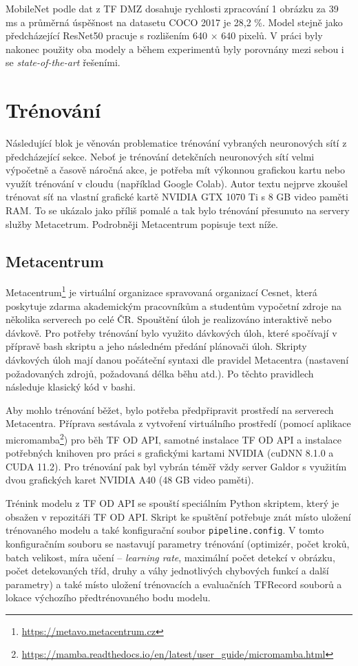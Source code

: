 MobileNet podle dat z TF DMZ dosahuje rychlosti zpracování 1 obrázku za 39 ms a průměrná úspěšnost na datasetu COCO 2017 je 28,2 \%. Model stejně jako předcházející ResNet50 pracuje s rozlišením 640 $\times$ 640 pixelů. V práci byly nakonec použity oba modely a během experimentů byly porovnány mezi sebou i se \emph{state-of-the-art} řešeními.

\section{Trénování}
\label{sekce:trenovani}
Následující blok je věnován problematice trénování vybraných neuronových sítí z předcházející sekce. Neboť je trénování detekčních neuronových sítí velmi výpočetně a časově náročná akce, je potřeba mít výkonnou grafickou kartu nebo využít trénování v cloudu (například Google Colab). Autor textu nejprve zkoušel trénovat síť na vlastní grafické kartě NVIDIA GTX 1070 Ti s 8 GB video paměti RAM. To se ukázalo jako příliš pomalé a tak bylo trénování přesunuto na servery služby Metacetrum. Podrobněji Metacentrum popisuje text níže.

\subsection*{Metacentrum}
Metacentrum\footnote{\url{https://metavo.metacentrum.cz}} je virtuální organizace spravovaná organizací Cesnet, která poskytuje zdarma akademickým pracovníkům a studentům vypočetní zdroje na několika serverech po celé ČR. Spouštění úloh je realizováno interaktivě nebo dávkově. Pro potřeby trénování bylo využito dávkových úloh, které spočívají v přípravě bash skriptu a jeho následném předání plánovači úloh. Skripty dávkových úloh mají danou počáteční syntaxi dle pravidel Metacentra (nastavení požadovaných zdrojů, požadovaná délka běhu atd.). Po těchto pravidlech následuje klasický kód v bashi.

Aby mohlo trénování běžet, bylo potřeba předpřipravit prostředí na serverech Metacentra. Příprava sestávala z vytvoření virtuálního prostředí (pomocí aplikace micromamba\footnote{\url{https://mamba.readthedocs.io/en/latest/user\_guide/micromamba.html}}) pro běh TF OD API, samotné instalace TF OD API a instalace potřebných knihoven pro práci s grafickými kartami NVIDIA (cuDNN 8.1.0 a CUDA 11.2). Pro trénování pak byl vybrán téměř vždy server Galdor s využitím dvou grafických karet NVIDIA A40 (48 GB video paměti).

Trénink modelu z TF OD API se spouští speciálním Python skriptem, který je obsažen v repozitáři TF OD API. Skript ke spuštění potřebuje znát místo uložení trénovaného modelu a také konfigurační soubor \texttt{pipeline.config}. V tomto konfiguračním souboru se nastavují parametry trénování (optimizér, počet kroků, batch velikost, míra učení -- \emph{learning rate}, maximální počet detekcí v obrázku, počet detekovaných tříd, druhy a váhy jednotlivých chybových funkcí a další parametry) a také místo uložení trénovacích a evaluačních TFRecord souborů a lokace výchozího předtrénovaného bodu modelu.


